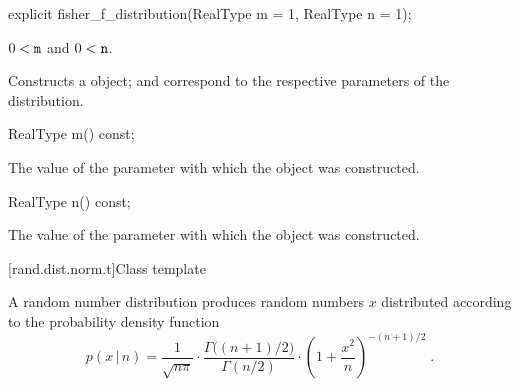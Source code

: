 %
\begin{itemdecl}
explicit fisher_f_distribution(RealType m = 1, RealType n = 1);
\end{itemdecl}

\begin{itemdescr}
\pnum\requires
 $ 0 < \texttt{m} $ and $ 0 < \texttt{n} $.

\pnum\effects Constructs a  object;
  and 
 correspond to the respective parameters of the distribution.
\end{itemdescr}

%
%
\begin{itemdecl}
RealType m() const;
\end{itemdecl}

\begin{itemdescr}
\pnum\returns The value of the  parameter
 with which the object was constructed.
\end{itemdescr}

%
%
\begin{itemdecl}
RealType n() const;
\end{itemdecl}

\begin{itemdescr}
\pnum\returns The value of the  parameter
 with which the object was constructed.
\end{itemdescr}


[rand.dist.norm.t]{Class template }%
%

\pnum
A  random number distribution
produces random numbers $x$
distributed according to
the probability density function%
%
\[%
 p(x\,|\,n)
      =  \frac{1}
              {\sqrt{n \pi}}
         \cdot \frac{\Gamma\big((n+1)/2\big)}
                    {\Gamma(n/2)}
         \cdot \left( 1+\frac{x^2}{n} \right) ^ {-(n+1)/2}
\; \mbox{.}
\]

